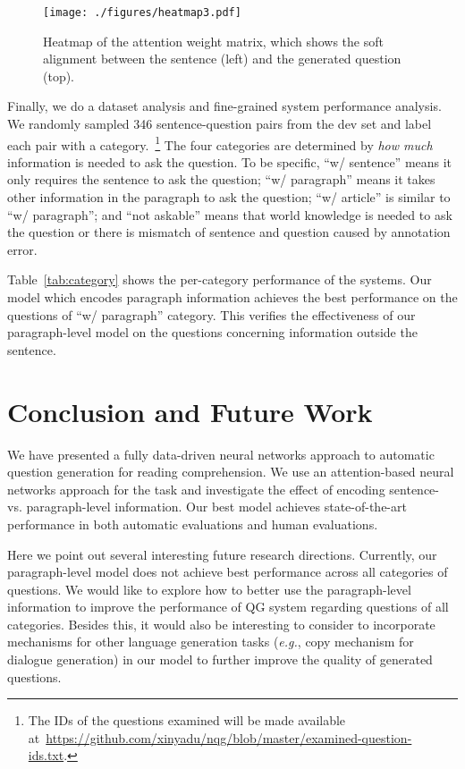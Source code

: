 \documentclass[11pt,a4paper]{article}
\newcommand{\eg}{{\em e.g.}}
\begin{document}
\begin{figure}[t]
\centering
\small
\texttt{[image: ./figures/heatmap3.pdf]}
\vspace{-0.5cm}
\caption{Heatmap of the attention weight matrix, which shows the soft alignment between the sentence (left) and the generated question (top).}
\label{fig:heatmap}
\vspace{-0.1cm}
\end{figure}

Finally, we do a dataset analysis and fine-grained system performance analysis. We randomly sampled 346 sentence-question pairs from the dev set and label each pair with a category.~\footnote{The IDs of the questions examined will be made available at~\url{https://github.com/xinyadu/nqg/blob/master/examined-question-ids.txt}.} The four categories are determined by \emph{how much} information is needed to ask the question. To be specific, ``w/ sentence'' means it only requires the sentence to ask the question; ``w/ paragraph'' means it takes other information in the paragraph to ask the question; ``w/ article'' is similar to ``w/ paragraph''; and ``not askable'' means that world knowledge is needed to ask the question or there is mismatch of sentence and question caused by annotation error.


 Table~\ref{tab:category} shows the per-category performance of the systems. Our model which encodes paragraph information achieves the best performance on the questions of ``w/ paragraph'' category. This verifies the effectiveness of our paragraph-level model on the questions concerning information outside the sentence.



\section{Conclusion and Future Work}

We have presented a fully data-driven neural networks approach to automatic question generation for reading comprehension. We use an attention-based neural networks approach for the task and investigate the effect of encoding sentence- vs. paragraph-level information. Our best model achieves state-of-the-art performance in both automatic evaluations and human evaluations.

Here we point out several interesting future research directions. Currently, our paragraph-level model does not achieve best performance across all categories of questions. We would like to explore how to better use the paragraph-level information to improve the performance of QG system regarding questions of all categories. Besides this, it would also be interesting to consider to incorporate mechanisms for other language generation tasks (\eg, copy mechanism for dialogue generation) in our model to further improve the quality of generated questions.
\end{document}
